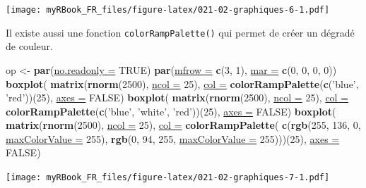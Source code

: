 \documentclass[twoside,symmetric]{book}
\newenvironment{Shaded}{}{}
\newcommand{\DataTypeTok}[1]{\underline{#1}}
\newcommand{\DecValTok}[1]{#1}
\newcommand{\KeywordTok}[1]{\textbf{#1}}
\newcommand{\NormalTok}[1]{#1}
\newcommand{\OtherTok}[1]{#1}
\newcommand{\StringTok}[1]{#1}
\begin{document}
\texttt{[image: myRBook\_FR\_files/figure-latex/021-02-graphiques-6-1.pdf]}

Il existe aussi une fonction \texttt{colorRampPalette()} qui permet de créer un dégradé de couleur.

\begin{Shaded}
\begin{Highlighting}[]
\NormalTok{op <-}\StringTok{ }\KeywordTok{par}\NormalTok{(}\DataTypeTok{no.readonly =} \OtherTok{TRUE}\NormalTok{)}
\KeywordTok{par}\NormalTok{(}\DataTypeTok{mfrow =} \KeywordTok{c}\NormalTok{(}\DecValTok{3}\NormalTok{, }\DecValTok{1}\NormalTok{), }\DataTypeTok{mar =} \KeywordTok{c}\NormalTok{(}\DecValTok{0}\NormalTok{, }\DecValTok{0}\NormalTok{, }\DecValTok{0}\NormalTok{, }\DecValTok{0}\NormalTok{))}
\KeywordTok{boxplot}\NormalTok{(}
  \KeywordTok{matrix}\NormalTok{(}\KeywordTok{rnorm}\NormalTok{(}\DecValTok{2500}\NormalTok{), }\DataTypeTok{ncol =} \DecValTok{25}\NormalTok{), }
  \DataTypeTok{col =} \KeywordTok{colorRampPalette}\NormalTok{(}\KeywordTok{c}\NormalTok{(}\StringTok{'blue'}\NormalTok{, }\StringTok{'red'}\NormalTok{))(}\DecValTok{25}\NormalTok{), }
  \DataTypeTok{axes =} \OtherTok{FALSE}\NormalTok{)}
\KeywordTok{boxplot}\NormalTok{(}
  \KeywordTok{matrix}\NormalTok{(}\KeywordTok{rnorm}\NormalTok{(}\DecValTok{2500}\NormalTok{), }\DataTypeTok{ncol =} \DecValTok{25}\NormalTok{), }
  \DataTypeTok{col =} \KeywordTok{colorRampPalette}\NormalTok{(}\KeywordTok{c}\NormalTok{(}\StringTok{'blue'}\NormalTok{, }\StringTok{'white'}\NormalTok{, }\StringTok{'red'}\NormalTok{))(}\DecValTok{25}\NormalTok{), }
  \DataTypeTok{axes =} \OtherTok{FALSE}\NormalTok{)}
\KeywordTok{boxplot}\NormalTok{(}
  \KeywordTok{matrix}\NormalTok{(}\KeywordTok{rnorm}\NormalTok{(}\DecValTok{2500}\NormalTok{), }\DataTypeTok{ncol =} \DecValTok{25}\NormalTok{), }
  \DataTypeTok{col =}  \KeywordTok{colorRampPalette}\NormalTok{(}
    \KeywordTok{c}\NormalTok{(}\KeywordTok{rgb}\NormalTok{(}\DecValTok{255}\NormalTok{, }\DecValTok{136}\NormalTok{, }\DecValTok{0}\NormalTok{, }\DataTypeTok{maxColorValue =} \DecValTok{255}\NormalTok{),  }
    \KeywordTok{rgb}\NormalTok{(}\DecValTok{0}\NormalTok{, }\DecValTok{94}\NormalTok{, }\DecValTok{255}\NormalTok{, }\DataTypeTok{maxColorValue =} \DecValTok{255}\NormalTok{)))(}\DecValTok{25}\NormalTok{), }
  \DataTypeTok{axes =} \OtherTok{FALSE}\NormalTok{)}
\end{Highlighting}
\end{Shaded}

\texttt{[image: myRBook\_FR\_files/figure-latex/021-02-graphiques-7-1.pdf]}
\end{document}
